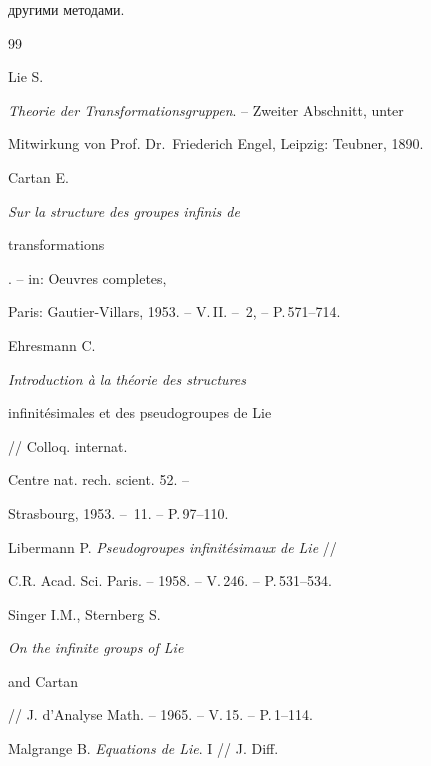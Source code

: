 другими методами.








\begin{thebibliography}{99}










Lie S.


{\em Theorie der Transformationsgruppen}. -- Zweiter Abschnitt, unter


Mitwirkung von Prof. Dr.~Friederich Engel, Leipzig: Teubner, 1890.







Cartan E. {\it Sur la structure des groupes infinis de


transformations}. -- in: {Oeuvres completes}, 


Paris: Gautier-Villars, 1953. -- V.\,II. -- \No\,2, -- P.\,571--714.







Ehresmann C. {\it Introduction \`a la th\'eorie des structures


infinit\'esimales et des pseudogroupes de Lie} // Colloq. internat.


Centre nat. rech. scient. 52. --


Strasbourg, 1953. -- \No\,11. -- P.\,97--110.







Libermann P. {\it Pseudogroupes infinit\'esimaux de Lie} //


C.\;R. Acad. Sci. Paris. -- 1958. -- V.\,246. -- P.\,531--534.







Singer I.M., Sternberg S. {\it On the infinite groups of Lie


and Cartan} // J. d'Analyse Math. -- 1965. -- V.\,15. -- P.\,1--114.







Malgrange B. {\it Equations de Lie}. I // J. Diff.



\end{thebibliography}
